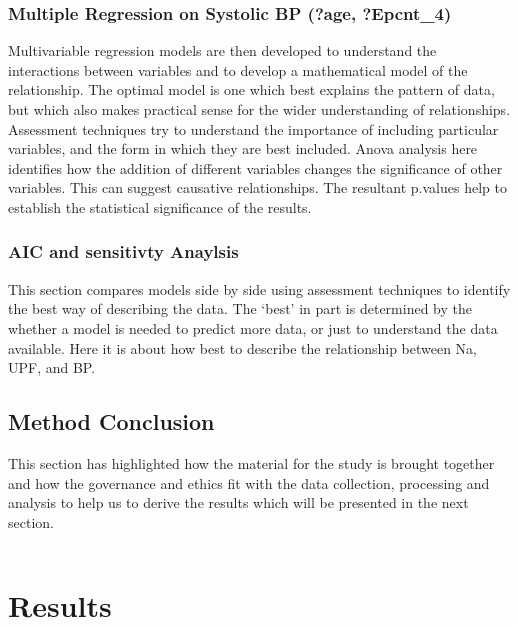 \documentclass[
]{article}
\begin{document}
\hypertarget{multiple-regression-on-systolic-bp-age-epcnt_4}{%
\subsubsection{Multiple Regression on Systolic BP (?age,
?Epcnt\_4)}\label{multiple-regression-on-systolic-bp-age-epcnt_4}}

Multivariable regression models are then developed to understand the
interactions between variables and to develop a mathematical model of
the relationship. The optimal model is one which best explains the
pattern of data, but which also makes practical sense for the wider
understanding of relationships. Assessment techniques try to understand
the importance of including particular variables, and the form in which
they are best included. Anova analysis here identifies how the addition
of different variables changes the significance of other variables. This
can suggest causative relationships. The resultant p.values help to
establish the statistical significance of the results.

\hypertarget{aic-and-sensitivty-anaylsis}{%
\subsubsection{AIC and sensitivty
Anaylsis}\label{aic-and-sensitivty-anaylsis}}

This section compares models side by side using assessment techniques to
identify the best way of describing the data. The `best' in part is
determined by the whether a model is needed to predict more data, or
just to understand the data available. Here it is about how best to
describe the relationship between Na, UPF, and BP.

\hypertarget{method-conclusion}{%
\subsection{Method Conclusion}\label{method-conclusion}}

This section has highlighted how the material for the study is brought
together and how the governance and ethics fit with the data collection,
processing and analysis to help us to derive the results which will be
presented in the next section.

\begin{verbatim}
\end{verbatim}

\newpage

\hypertarget{results}{%
\section{Results}\label{results}}
\end{document}
